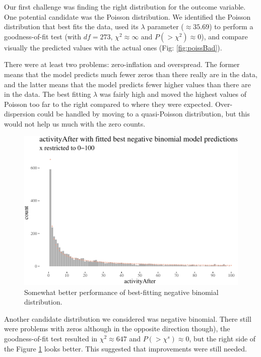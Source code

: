 \documentclass[
  10pt,
  dvipsnames]{scrartcl}
\begin{document}
Our first challenge was finding the right distribution for the outcome
variable. One potential candidate was the Poisson distribution. We
identified the Poisson distribution that best fits the data, used its
\(\lambda\) parameter (\(\approx 35.69\)) to perform a goodness-of-fit
test (with \(df=273\), \(\chi^2 \approx \infty\) and
\(P(>\chi^2)\approx 0\)), and compare visually the predicted values with
the actual ones (Fig: \ref{fig:poissBad}).

There were at least two problems: zero-inflation and overspread. The
former means that the model predicts much fewer zeros than there really
are in the data, and the latter means that the model predicts fewer
higher values than there are in the data. The best fitting \(\lambda\)
was fairly high and moved the highest values of Poisson too far to the
right compared to where they were expected. Over-dispersion could be
handled by moving to a quasi-Poisson distribution, but this would not
help us much with the zero counts.

\footnotesize

\normalsize

\begin{figure}[H]

\begin{center}\includegraphics[width=1\linewidth]{testPatrycja_files/figure-latex/unnamed-chunk-35-1} \end{center}
\caption{Somewhat better performance of best-fitting negative binomial distribution.}
\label{fig:nbinperf}
\end{figure}

Another candidate distribution we considered was negative binomial.
There still were problems with zeros although in the opposite direction
though), the goodness-of-fit test resulted in \(\chi^2 \approx 647\) and
\(P(>\chi^s)\approx 0\), but the right side of the Figure
\ref{fig:nbinperf} looks better. This suggested that improvements were
still needed.
\end{document}
